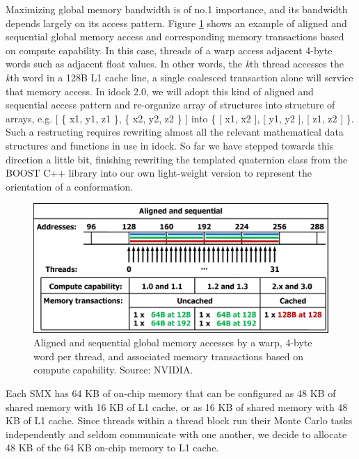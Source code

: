 Maximizing global memory bandwidth is of no.1 importance, and its bandwidth depends largely on its access pattern. Figure \ref{GPU:AlignedSequentialGlobalMemoryAccess} shows an example of aligned and sequential global memory access and corresponding memory transactions based on compute capability. In this case, threads of a warp access adjacent 4-byte words such as adjacent float values. In other words, the \textit{k}th thread accesses the \textit{k}th word in a 128B L1 cache line, a single coalesced transaction alone will service that memory access. In idock 2.0, we will adopt this kind of aligned and sequential access pattern and re-organize array of structures into structure of arrays, e.g.  [ \{ x1, y1, z1 \}, \{ x2, y2, z2 \} ] into \{ [ x1, x2 ], [ y1, y2 ], [ z1, z2 ] \}. Such a restructing requires rewriting almost all the relevant mathematical data structures and functions in use in idock. So far we have stepped towards this direction a little bit, finishing rewriting the templated quaternion class from the BOOST C++ library into our own light-weight version to represent the orientation of a conformation.

\begin{figure}
\centering
\includegraphics[width=\linewidth]{GPU/AlignedSequentialGlobalMemoryAccess.png}
\caption{Aligned and sequential global memory accesses by a warp, 4-byte word per thread, and associated memory transactions based on compute capability. Source: NVIDIA.}
\label{GPU:AlignedSequentialGlobalMemoryAccess}
\end{figure}

Each SMX has 64 KB of on-chip memory that can be configured as 48 KB of shared memory with 16 KB of L1 cache, or as 16 KB of shared memory with 48 KB of L1 cache. Since threads within a thread block run their Monte Carlo tasks independently and seldom communicate with one another, we decide to allocate 48 KB of the 64 KB on-chip memory to L1 cache.


